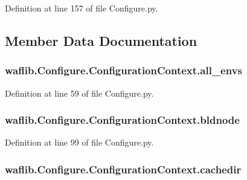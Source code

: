 Definition at line 157 of file Configure.\+py.



\subsection{Member Data Documentation}
\subsubsection[{\texorpdfstring{all\+\_\+envs}{all_envs}}]{\setlength{\rightskip}{0pt plus 5cm}waflib.\+Configure.\+Configuration\+Context.\+all\+\_\+envs}\hypertarget{classwaflib_1_1_configure_1_1_configuration_context_a2a854b43099bb450e2ddf76d7bbedc1b}{}\label{classwaflib_1_1_configure_1_1_configuration_context_a2a854b43099bb450e2ddf76d7bbedc1b}


Definition at line 59 of file Configure.\+py.

\subsubsection[{\texorpdfstring{bldnode}{bldnode}}]{\setlength{\rightskip}{0pt plus 5cm}waflib.\+Configure.\+Configuration\+Context.\+bldnode}\hypertarget{classwaflib_1_1_configure_1_1_configuration_context_a66b0f6841a7a4c72c987db9ea1ba1b28}{}\label{classwaflib_1_1_configure_1_1_configuration_context_a66b0f6841a7a4c72c987db9ea1ba1b28}


Definition at line 99 of file Configure.\+py.

\subsubsection[{\texorpdfstring{cachedir}{cachedir}}]{\setlength{\rightskip}{0pt plus 5cm}waflib.\+Configure.\+Configuration\+Context.\+cachedir}\hypertarget{classwaflib_1_1_configure_1_1_configuration_context_a23b9593fb2789a28e6a10a86bcf4f56e}{}\label{classwaflib_1_1_configure_1_1_configuration_context_a23b9593fb2789a28e6a10a86bcf4f56e}


